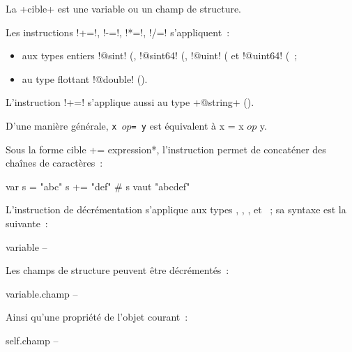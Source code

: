 La \ggs+cible+ est une variable ou un champ de structure.

Les instructions \ggs!+=!, \ggs!-=!, \ggs!*=!, \ggs!/=! s'appliquent~:
\begin{itemize}
 \item aux types entiers \ggs!@sint! (, \ggs!@sint64! (, \ggs!@uint! ( et \ggs!@uint64! (~;
 \item au type flottant \ggs!@double! ().
\end{itemize}

L'instruction \ggs!+=! s'applique aussi au type \ggs+@string+ ().

D'une manière générale, \texttt{x $op$= y} est équivalent à {x = x $op$ y}.



Sous la forme \ggs*cible += expression*, l'instruction permet de concaténer des chaînes de caractères~:
\begin{galgas}
var s = "abc"
s += "def" # s vaut "abcdef"
\end{galgas}
















L'instruction de décrémentation s'applique aux types , , ,  et ~; sa syntaxe est la suivante~:

\begin{galgasbox}
variable --
\end{galgasbox}

Les champs de structure peuvent être décrémentés~:
\begin{galgasbox}
variable.champ --
\end{galgasbox}


Ainsi qu'une propriété de l'objet courant~:
\begin{galgasbox}
self.champ --
\end{galgasbox}

